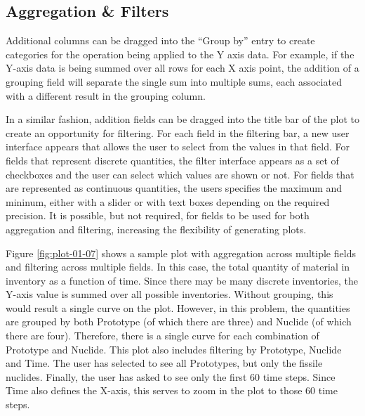\subsection{Aggregation \& Filters}

Additional columns can be dragged into the ``Group by'' entry to create
categories for the operation being applied to the Y axis data.  For example,
if the Y-axis data is being summed over all rows for each X axis point, the
addition of a grouping field will separate the single sum into multiple sums,
each associated with a different result in the grouping column.

In a similar fashion, addition fields can be dragged into the title bar of the
plot to create an opportunity for filtering.  For each field in the filtering
bar, a new user interface appears that allows the user to select from the
values in that field.  For fields that represent discrete quantities, the
filter interface appears as a set of checkboxes and the user can select which
values are shown or not.  For fields that are represented as continuous
quantities, the users specifies the maximum and mininum, either with a slider
or with text boxes depending on the required precision.  It is possible, but
not required, for fields to be used for both aggregation and filtering,
increasing the flexibility of generating plots.

Figure \ref{fig:plot-01-07} shows a sample plot with aggregation across
multiple fields and filtering across multiple fields.  In this case, the total
quantity of material in inventory as a function of time.  Since there may be
many discrete inventories, the Y-axis value is summed over all possible
inventories.  Without grouping, this would result a single curve on the plot.
However, in this problem, the quantities are grouped by both Prototype (of
which there are three) and Nuclide (of which there are four).  Therefore,
there is a single curve for each combination of Prototype and Nuclide.  This
plot also includes filtering by Prototype, Nuclide and Time.  The user has
selected to see all Prototypes, but only the fissile nuclides.  Finally, the
user has asked to see only the first 60 time steps.  Since Time also defines
the X-axis, this serves to zoom in the plot to those 60 time steps.

